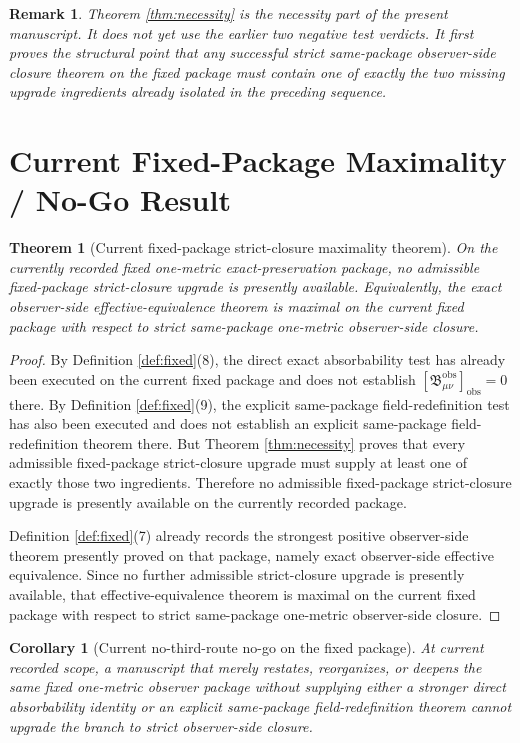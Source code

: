 \documentclass[11pt]{article}
\newcommand{\ObsBurden}{\mathfrak B_{\mu\nu}^{\mathrm{obs}}}
\newcommand{\ObserverClass}[1]{\left[#1\right]_{\mathrm{obs}}}
\newtheorem{remark}{Remark}
\newtheorem{corollary}{Corollary}
\newtheorem{theorem}{Theorem}
\begin{document}
\begin{remark}
Theorem \ref{thm:necessity} is the necessity part of the present manuscript. It does not yet use the earlier two negative test verdicts. It first proves the structural point that any successful strict same-package observer-side closure theorem on the fixed package must contain one of exactly the two missing upgrade ingredients already isolated in the preceding sequence.
\end{remark}

\section{Current Fixed-Package Maximality / No-Go Result}

\begin{theorem}[Current fixed-package strict-closure maximality theorem]
\label{thm:maximality}
On the currently recorded fixed one-metric exact-preservation package, no admissible fixed-package strict-closure upgrade is presently available. Equivalently, the exact observer-side effective-equivalence theorem is maximal on the current fixed package with respect to strict same-package one-metric observer-side closure.
\end{theorem}

\begin{proof}
By Definition \ref{def:fixed}(8), the direct exact absorbability test has already been executed on the current fixed package and does not establish \(\ObserverClass{\ObsBurden}=0\) there. By Definition \ref{def:fixed}(9), the explicit same-package field-redefinition test has also been executed and does not establish an explicit same-package field-redefinition theorem there. But Theorem \ref{thm:necessity} proves that every admissible fixed-package strict-closure upgrade must supply at least one of exactly those two ingredients. Therefore no admissible fixed-package strict-closure upgrade is presently available on the currently recorded package.

Definition \ref{def:fixed}(7) already records the strongest positive observer-side theorem presently proved on that package, namely exact observer-side effective equivalence. Since no further admissible strict-closure upgrade is presently available, that effective-equivalence theorem is maximal on the current fixed package with respect to strict same-package one-metric observer-side closure.
\end{proof}

\begin{corollary}[Current no-third-route no-go on the fixed package]
\label{cor:nothird}
At current recorded scope, a manuscript that merely restates, reorganizes, or deepens the same fixed one-metric observer package without supplying either a stronger direct absorbability identity or an explicit same-package field-redefinition theorem cannot upgrade the branch to strict observer-side closure.
\end{corollary}
\end{document}
